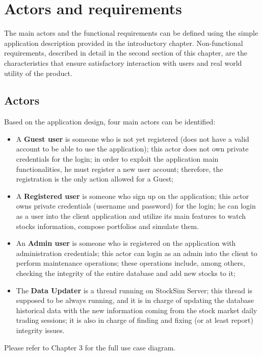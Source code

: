\chapter{Actors and requirements}
The main actors and the functional requirements can be defined using the simple
application description provided in the introductory chapter. Non-functional
requirements, described in detail in the second section of this chapter, are the
characteristics that ensure satisfactory interaction with users and real world
utility of the product.

\section{Actors}
Based on the application design, four main actors can be identified:
\begin{itemize}
    \item A \textbf{Guest user} is someone who is not yet registered (does not
    have a valid account to be able to use the application); this actor does not
    own private credentials for the login; in order to exploit the application
    main functionalities, he must register a new user account; therefore, the
    registration is the only action allowed for a Guest;

    \item A \textbf{Registered user} is someone who sign up on the application;
    this actor owns private credentials (username and password) for the login;
    he can login as a user into the client application and utilize its main
    features to watch stocks information, compose portfolios and simulate them. 
   
    \item An \textbf{Admin user} is someone who is registered on the application
    with administration credentials; this actor can login as an admin into the
    client to perform maintenance operations; these operations include, among
    others, checking the integrity of the entire database and add new stocks to
    it;

    \item The \textbf{Data Updater} is a thread running on StockSim Server; this 
    thread is supposed to be always running, and it is in charge of updating the
    database historical data with the new information coming from the stock
    market daily trading sessions; it is also in charge of finding and fixing
    (or at least report) integrity issues.
\end{itemize}
Please refer to Chapter 3 for the full use case diagram.

